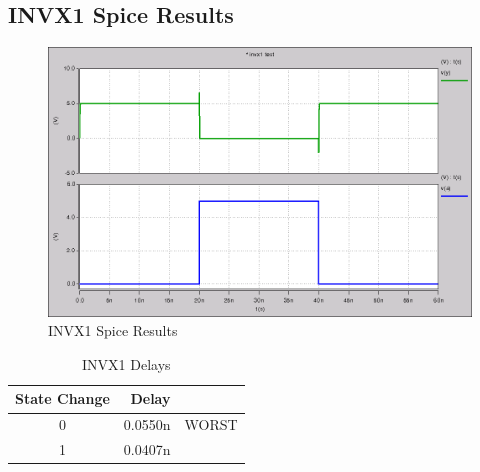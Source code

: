     \subsection{INVX1 Spice Results}
        
        \begin{figure}[H]
            \centering
            \includegraphics[width=0.75\linewidth]{../../spice/invx1.png}
            \caption{INVX1 Spice Results}
        \end{figure}
        \begin{table}[H]
            \centering
            \begin{tabular}{crc}
                \toprule
                \textbf{State Change} & \textbf{Delay} & \\
                \midrule
                0 & 0.0550n & WORST \\
                1 & 0.0407n & \\
                \bottomrule
            \end{tabular}
            \caption{INVX1 Delays}
        \end{table}

    \newpage
